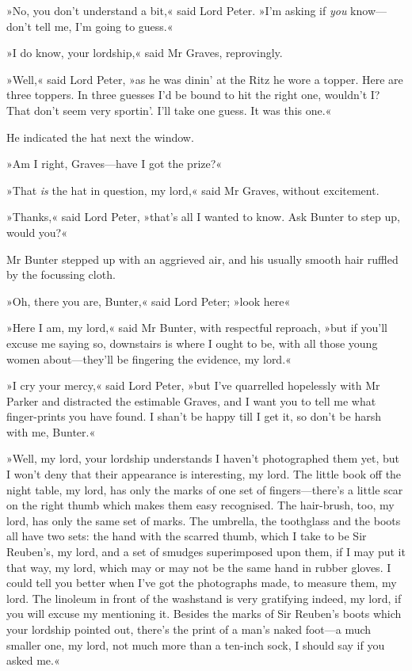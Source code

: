 »No, you don't understand a bit,« said Lord Peter. »I'm asking if \textit{you} know\allowbreak---\allowbreak don't tell me, I'm going to guess.«

»I do know, your lordship,« said Mr Graves, reprovingly.

»Well,« said Lord Peter, »as he was dinin' at the Ritz he wore a topper. Here are three toppers. In three guesses I'd be bound to hit the right one, wouldn't I? That don't seem very sportin'. I'll take one guess. It was this one.«

He indicated the hat next the window.

»Am I right, Graves\allowbreak---\allowbreak have I got the prize?«

»That \textit{is} the hat in question, my lord,« said Mr Graves, without excitement.

»Thanks,« said Lord Peter, »that's all I wanted to know. Ask Bunter to step up, would you?«

Mr Bunter stepped up with an aggrieved air, and his usually smooth hair ruffled by the focussing cloth.

»Oh, there you are, Bunter,« said Lord Peter; »look here\longdash«

»Here I am, my lord,« said Mr Bunter, with respectful reproach, »but if you'll excuse me saying so, downstairs is where I ought to be, with all those young women about\allowbreak---\allowbreak they'll be fingering the evidence, my lord.«

»I cry your mercy,« said Lord Peter, »but I've quarrelled hopelessly with Mr Parker and distracted the estimable Graves, and I want you to tell me what finger-prints you have found. I shan't be happy till I get it, so don't be harsh with me, Bunter.«

»Well, my lord, your lordship understands I haven't photographed them yet, but I won't deny that their appearance is interesting, my lord. The little book off the night table, my lord, has only the marks of one set of fingers\allowbreak---\allowbreak there's a little scar on the right thumb which makes them easy recognised. The hair-brush, too, my lord, has only the same set of marks. The umbrella, the toothglass and the boots all have two sets: the hand with the scarred thumb, which I take to be Sir Reuben's, my lord, and a set of smudges superimposed upon them, if I may put it that way, my lord, which may or may not be the same hand in rubber gloves. I could tell you better when I've got the photographs made, to measure them, my lord. The linoleum in front of the washstand is very gratifying indeed, my lord, if you will excuse my mentioning it. Besides the marks of Sir Reuben's boots which your lordship pointed out, there's the print of a man's naked foot\allowbreak---\allowbreak a much smaller one, my lord, not much more than a ten-inch sock, I should say if you asked me.«

